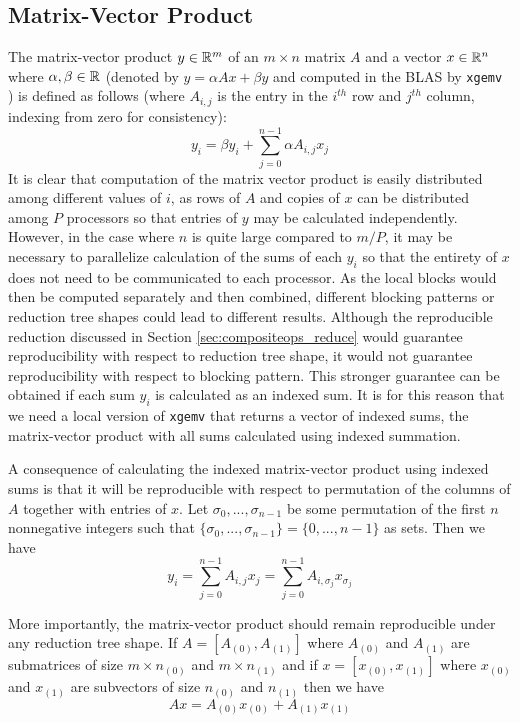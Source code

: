 \subsection{Matrix-Vector Product}
  \label{sec:compositeops_gemv}
  The matrix-vector product $y \in \mathbb{R}^m$ of an $m \times n$ matrix $A$ and a vector $x \in \mathbb{R}^n$ where $\alpha, \beta \in \mathbb{R}$ (denoted by $y = \alpha Ax + \beta y$ and computed in the BLAS by \texttt{xgemv} \cite{BLAS}) is defined as follows (where $A_{i, j}$ is the entry in the $i^{th}$ row and $j^{th}$ column, indexing from zero for consistency):
  \[
    y_i = \beta y_i + \sum\limits_{j = 0}^{n - 1} \alpha A_{i, j}x_j
  \]
  It is clear that computation of the matrix vector product is easily distributed among different values of $i$, as rows of $A$ and copies of $x$ can be distributed among $P$ processors so that entries of $y$ may be calculated independently.
  However, in the case where $n$ is quite large compared to $m/P$, it may be necessary to parallelize calculation of the sums of each $y_i$ so that the entirety of $x$ does not need to be communicated to each processor.
  As the local blocks would then be computed separately and then combined, different blocking patterns or reduction tree shapes could lead to different results.
  Although the reproducible reduction discussed in Section \ref{sec:compositeops_reduce} would guarantee reproducibility with respect to reduction tree shape, it would not guarantee reproducibility with respect to blocking pattern. This stronger guarantee can be obtained if each sum $y_i$ is calculated as an indexed sum.
  It is for this reason that we need a local version of \texttt{xgemv} that returns a vector of indexed sums, the matrix-vector product with all sums calculated using indexed summation.

  A consequence of calculating the indexed matrix-vector product using indexed sums is that it will be reproducible with respect to permutation of the columns of $A$ together with entries of $x$.
  Let $\sigma_0, ..., \sigma_{n - 1}$ be some permutation of the first $n$ nonnegative integers such that $\{\sigma_0, ..., \sigma_{n - 1}\} = \{0, ..., n - 1\}$ as sets. Then we have
  \begin{equation}
    y_i = \sum\limits_{j = 0}^{n - 1} A_{i, j}x_j = \sum\limits_{j = 0}^{n - 1} A_{i, \sigma_j}x_{\sigma_j}
    \label{eq:gemvpermute}
  \end{equation}

  More importantly, the matrix-vector product should remain reproducible under any reduction tree shape.
  If $A = [A_{(0)}, A_{(1)}]$ where $A_{(0)}$ and $A_{(1)}$ are submatrices of size $m \times n_{(0)}$ and $m \times n_{(1)}$ and if $x = [x_{(0)}, x_{(1)}]$ where $x_{(0)}$ and $x_{(1)}$ are subvectors of size $n_{(0)}$ and $n_{(1)}$ then we have 
  \begin{equation}
    Ax = A_{(0)}x_{(0)} + A_{(1)}x_{(1)}
    \label{eq:gemvblock}
  \end{equation}

